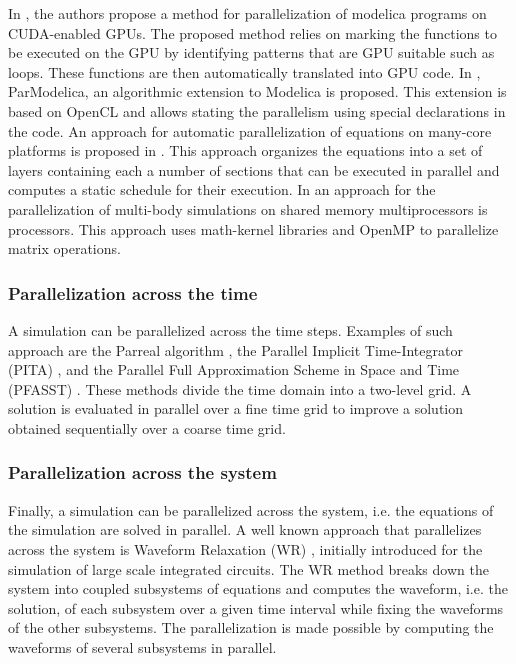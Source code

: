 In \cite{elmqvist:2015}, the authors propose a method for parallelization of modelica programs on CUDA-enabled GPUs. The proposed method relies on marking the functions to be executed on the GPU by identifying patterns that are GPU suitable such as loops. These functions are then automatically translated into GPU code. In \cite{Gebremedhin2012}, ParModelica, an algorithmic extension to Modelica is proposed. This extension is based on OpenCL and allows stating the parallelism using special declarations in the code. An approach for automatic parallelization of equations on many-core platforms is proposed in \cite{elmqvist:2014}. This approach organizes the equations into a set of layers containing each a number of sections that can be executed in parallel and computes a static schedule for their execution. In \cite{clauberg:2012} an approach for the parallelization of multi-body simulations on shared memory multiprocessors is processors. This approach uses math-kernel libraries and OpenMP to parallelize matrix operations.

\subsubsection{Parallelization across the time}

A simulation can be parallelized across the time steps. Examples of such approach are the Parreal algorithm \cite{lions:2001}, the Parallel Implicit Time-Integrator (PITA) \cite{farhat:2003}, and the Parallel Full Approximation Scheme in Space and Time (PFASST) \cite{emmett:2012}. These methods divide the time domain into a two-level grid. A solution is evaluated in parallel over a fine time grid to improve a solution obtained sequentially over a coarse time grid.
\subsubsection{Parallelization across the system}

Finally, a simulation can be parallelized across the system, i.e. the equations of the simulation are solved in parallel. A well known approach that parallelizes across the system is Waveform Relaxation (WR) \cite{lelarasmee:1982}, initially introduced for the simulation of large scale integrated circuits. The WR method breaks down the system into coupled subsystems of equations and computes the waveform, i.e. the solution, of each subsystem over a given time interval while fixing the waveforms of the other subsystems. The parallelization is made possible by computing the waveforms of several subsystems in parallel. 

